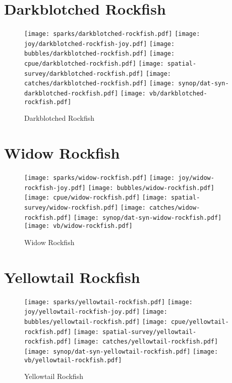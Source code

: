 \section{Darkblotched Rockfish}

\begin{figure}[htbp]
\centering
\texttt{[image: sparks/darkblotched-rockfish.pdf]}
\texttt{[image: joy/darkblotched-rockfish-joy.pdf]}
\texttt{[image: bubbles/darkblotched-rockfish.pdf]}
\texttt{[image: cpue/darkblotched-rockfish.pdf]}
\texttt{[image: spatial-survey/darkblotched-rockfish.pdf]}
\texttt{[image: catches/darkblotched-rockfish.pdf]}
\texttt{[image: synop/dat-syn-darkblotched-rockfish.pdf]}
\texttt{[image: vb/darkblotched-rockfish.pdf]}
\caption{Darkblotched Rockfish}
\end{figure}
\clearpage
\section{Widow Rockfish}

\begin{figure}[htbp]
\centering
\texttt{[image: sparks/widow-rockfish.pdf]}
\texttt{[image: joy/widow-rockfish-joy.pdf]}
\texttt{[image: bubbles/widow-rockfish.pdf]}
\texttt{[image: cpue/widow-rockfish.pdf]}
\texttt{[image: spatial-survey/widow-rockfish.pdf]}
\texttt{[image: catches/widow-rockfish.pdf]}
\texttt{[image: synop/dat-syn-widow-rockfish.pdf]}
\texttt{[image: vb/widow-rockfish.pdf]}
\caption{Widow Rockfish}
\end{figure}
\clearpage
\section{Yellowtail Rockfish}

\begin{figure}[htbp]
\centering
\texttt{[image: sparks/yellowtail-rockfish.pdf]}
\texttt{[image: joy/yellowtail-rockfish-joy.pdf]}
\texttt{[image: bubbles/yellowtail-rockfish.pdf]}
\texttt{[image: cpue/yellowtail-rockfish.pdf]}
\texttt{[image: spatial-survey/yellowtail-rockfish.pdf]}
\texttt{[image: catches/yellowtail-rockfish.pdf]}
\texttt{[image: synop/dat-syn-yellowtail-rockfish.pdf]}
\texttt{[image: vb/yellowtail-rockfish.pdf]}
\caption{Yellowtail Rockfish}
\end{figure}
\clearpage
